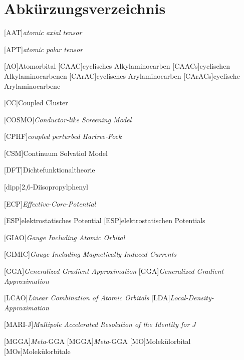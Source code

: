  {}
\renewcommand\refname{Abkürzungsverzeichnis} \chapter*{Abkürzungsverzeichnis}
\begin{acronym}[SEPSEP] %
    \setlength{\itemsep}{0.2cm} %
    
    [AAT]{\textit{atomic axial tensor}}
    
    [APT]{\textit{atomic polar tensor}}
    
    [AO]{Atomorbital}
	[CAAC]{cyclisches Alkylaminocarben}   
		[CAACs]{cyclischen Alkylaminocarbenen}
	[CArAC]{cyclisches Arylaminocarben}
		[CArACs]{cyclische Arylaminocarbene}
		
    [CC]{Coupled Cluster}		
		
 	[COSMO]{\textit{Conductor-like Screening Model}}
 	
	[CPHF]{\textit{coupled perturbed Hartree-Fock}}
	
	[CSM]{Continuum Solvatiol Model}
 	
    [DFT]{Dichtefunktionaltheorie}
    
    [dipp]{2,6-Diisopropylphenyl}
    
    [ECP]{\textit{Effective-Core-Potential}}
    
    [ESP]{elektrostatisches Potential}
	    [ESP]{elektrostatischen Potentials}
	
	[GIAO]{\textit{Gauge Including Atomic Orbital}}   
	
	[GIMIC]{\textit{Gauge Including Magnetically Induced Currents}} 

	[GGA]{\textit{Generalized-Gradient-Approximation}}   
		[GGA]{\textit{Generalized-Gradient-Approximation}}
		
	[LCAO]{\textit{Linear Combination of Atomic Orbitals}}
	[LDA]{\textit{Local-Density-Approximation}}
     
    [MARI-J]{\textit{Multipole Accelerated Resolution of the Identity for $J$}} 	
 	
	[MGGA]{\textit{Meta}-GGA}   
		{\textit{Meta}-GGA}	
	[MO]{Molekülorbital}   
		[MOs]{Molekülorbitale}
		

\end{acronym}
